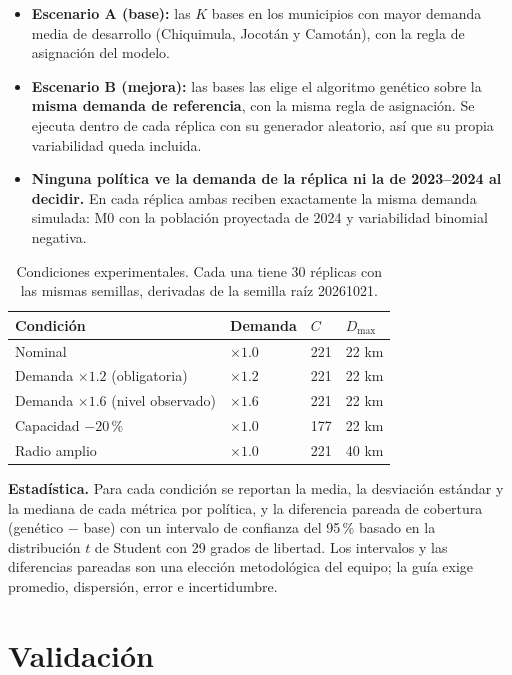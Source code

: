 \documentclass[11pt,letterpaper]{article}
\begin{document}
\begin{itemize}
  \item \textbf{Escenario A (base):} las $K$ bases en los municipios con mayor demanda media de desarrollo (Chiquimula, Jocotán y Camotán), con la regla de asignación del modelo.
  \item \textbf{Escenario B (mejora):} las bases las elige el algoritmo genético sobre la \textbf{misma demanda de referencia}, con la misma regla de asignación. Se ejecuta dentro de cada réplica con su generador aleatorio, así que su propia variabilidad queda incluida.
  \item \textbf{Ninguna política ve la demanda de la réplica ni la de 2023--2024 al decidir.} En cada réplica ambas reciben exactamente la misma demanda simulada: M0 con la población proyectada de 2024 y variabilidad binomial negativa.
\end{itemize}

\begin{table}[htbp]
\centering
\small
\begin{tabular}{llll}
\toprule
Condición & Demanda & $C$ & $D_{\max}$ \\
\midrule
Nominal & $\times1.0$ & 221 & 22 km \\
Demanda $\times1.2$ (obligatoria) & $\times1.2$ & 221 & 22 km \\
Demanda $\times1.6$ (nivel observado) & $\times1.6$ & 221 & 22 km \\
Capacidad $-20\,\%$ & $\times1.0$ & 177 & 22 km \\
Radio amplio & $\times1.0$ & 221 & 40 km \\
\bottomrule
\end{tabular}
\caption{Condiciones experimentales. Cada una tiene 30 réplicas con las mismas semillas, derivadas de la semilla raíz 20261021.}
\label{tab:condiciones}
\end{table}

\textbf{Estadística.} Para cada condición se reportan la media, la desviación estándar y la mediana de cada métrica por política, y la diferencia pareada de cobertura (genético $-$ base) con un intervalo de confianza del 95\,\% basado en la distribución $t$ de Student con 29 grados de libertad. Los intervalos y las diferencias pareadas son una elección metodológica del equipo; la guía exige promedio, dispersión, error e incertidumbre.

\section{Validación}
\label{sec:validacion}
\end{document}

